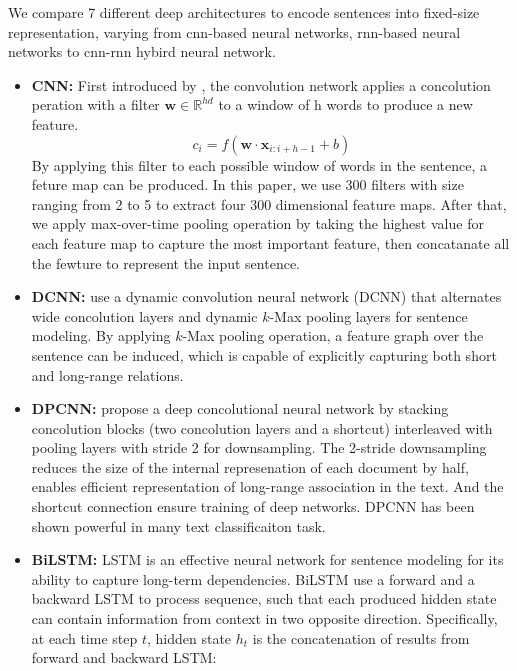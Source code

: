 \documentclass[11pt,a4paper]{article}
\begin{document}
We compare 7 different deep architectures to encode sentences into fixed-size representation, varying from  cnn-based neural networks, rnn-based neural networks to cnn-rnn hybird neural network.
\begin{itemize}
        \item \textbf{CNN:} First introduced by \cite{D14-1181}, the convolution network applies a concolution peration with a filter $\mathbf{w} \in \mathbb{R}^{h d}$ to a window of h words to produce a new feature.
        \begin {equation} 
	 c_{i}=f\left(\mathbf{w} \cdot \mathbf{x}_{i : i+h-1}+b\right)
 	\end {equation}
By applying this filter to each possible window of words in the sentence, a feture map can be produced. In this paper, we use 300 filters with size ranging from 2 to 5 to extract four 300 dimensional feature maps.  After that, we apply max-over-time pooling operation by taking the highest value for each feature map to capture the most important feature, then concatanate all the fewture to represent the input sentence.
        \item \textbf{DCNN:} \cite{P14-1062} use a dynamic convolution neural network (DCNN) that alternates wide concolution layers and dynamic $k$-Max pooling layers for sentence modeling. By applying $k$-Max pooling operation, a feature graph over the sentence can be induced, which is capable of explicitly capturing both short and long-range relations.
        \item \textbf{DPCNN:} \cite{P17-1052} propose a deep concolutional neural network by stacking concolution blocks (two concolution layers and a shortcut) interleaved with pooling layers with stride 2 for downsampling. The 2-stride downsampling reduces the size of the internal represenation of each document by half, enables efficient representation of long-range association in the text.  And the shortcut connection ensure training of deep networks. DPCNN has been shown powerful in many text classificaiton task.
        \item \textbf{BiLSTM:} LSTM is an effective neural network for sentence modeling for its ability to capture long-term dependencies. BiLSTM use a forward and a backward LSTM to process sequence, such that each produced hidden state can contain information from context in two opposite direction. Specifically, at each time step $t$, hidden state $h_{t}$ is the concatenation of results from forward and backward LSTM:
\begin{equation}

\end{equation}
\end{itemize}
\end{document}
